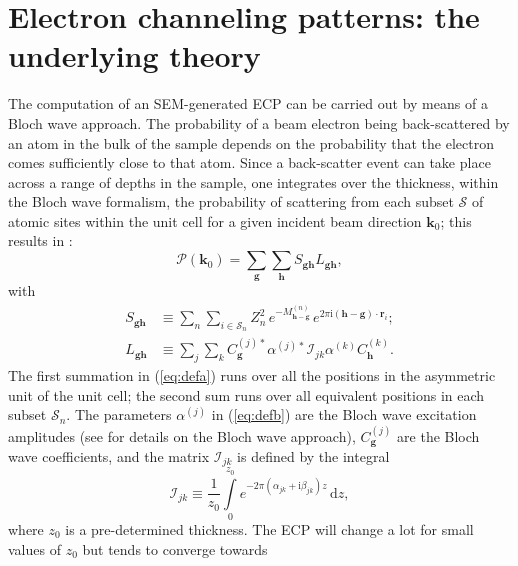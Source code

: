 \documentclass[DIV=calc, paper=letter, fontsize=11pt]{scrartcl}	 %
\begin{document}
%

\newpage
\section{Electron channeling patterns: the underlying theory\label{sec:theory}}
The computation of an SEM-generated ECP can be carried out by means of a Bloch wave approach. The probability
of a beam electron being back-scattered by an atom in the bulk of the sample depends on the probability that the electron
comes sufficiently close to that atom.  Since a back-scatter event can take place across a range of depths in the sample, one 
integrates over the thickness, within the Bloch wave formalism, the probability of scattering from each subset $\mathcal{S}$ of atomic sites within the 
unit cell for a given incident beam direction $\mathbf{k}_0$; this results in \parencite{winkelmann2003a,winkelmann2008a}:
\begin{equation}
	\mathcal{P}(\mathbf{k}_0) = \sum_{\mathbf{g}} 
    \sum_{\mathbf{h}} S_{\mathbf{g}\mathbf{h}}L_{\mathbf{g}\mathbf{h}},
    \label{eq:prob}
\end{equation}
with
\begin{subequations}
\begin{align}
    S_{\mathbf{g}\mathbf{h}} &\equiv \sum_{n}\sum_{i\in\mathcal{S}_n} Z^2_n\,e^{-M^{(n)}_{\mathbf{h}-\mathbf{g}}}\,e^{2\pi\mathrm{i} 
    (\mathbf{h}-\mathbf{g})\cdot\mathbf{r}_{i}};\label{eq:defa}\\
    L_{\mathbf{g}\mathbf{h}} &\equiv \sum_{j}\sum_{k} 
    C^{(j)\ast}_{\mathbf{g}}\alpha^{(j)\ast}\mathcal{I}_{jk}\alpha^{(k)}
    C^{(k)}_{\mathbf{h}}.\label{eq:defb}
\end{align}
\end{subequations}
The first summation in (\ref{eq:defa}) runs over all the positions in the asymmetric unit of the unit cell; the second
sum runs over all equivalent positions in each subset $\mathcal{S}_n$.
The parameters $\alpha^{(j)}$ in (\ref{eq:defb}) are the Bloch wave excitation amplitudes (see \parencite{humphreys1979a,degraef2003b} for 
details on the Bloch wave approach), $C_{\mathbf{g}}^{(j)}$ are the 
Bloch wave coefficients, and the matrix $\mathcal{I}_{jk}$ is defined by the integral
\begin{equation}
	\mathcal{I}_{jk}\equiv \frac{1}{z_{0}}\int\limits_{0}^{z_{0}} 
    e^{-2\pi(\alpha_{jk}+\mathrm{i}\beta_{jk})z}\,\mathrm{d}z,
\end{equation}
where $z_0$ is a pre-determined thickness.  The ECP will change a lot for small values of $z_0$ but tends to converge towards 
\end{document}
